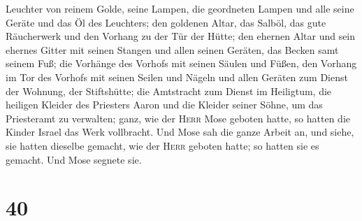 Leuchter von reinem Golde, seine Lampen, die geordneten Lampen und alle
seine Geräte und das Öl des Leuchters;  den goldenen
Altar, das Salböl, das gute Räucherwerk und den Vorhang zu der Tür der
Hütte;  den ehernen Altar und sein ehernes Gitter mit
seinen Stangen und allen seinen Geräten, das Becken samt seinem Fuß;
 die Vorhänge des Vorhofs mit seinen Säulen und Füßen,
den Vorhang im Tor des Vorhofs mit seinen Seilen und Nägeln und allen
Geräten zum Dienst der Wohnung, der Stiftshütte;  die
Amtstracht zum Dienst im Heiligtum, die heiligen Kleider des Priesters
Aaron und die Kleider seiner Söhne, um das Priesteramt zu verwalten;
 ganz, wie der \textsc{Herr} Mose geboten hatte, so
hatten die Kinder Israel das Werk vollbracht.  Und Mose
sah die ganze Arbeit an, und siehe, sie hatten dieselbe gemacht, wie der
\textsc{Herr} geboten hatte; so hatten sie es gemacht. Und Mose segnete
sie.

\hypertarget{section-39}{%
\section{40}\label{section-39}}

